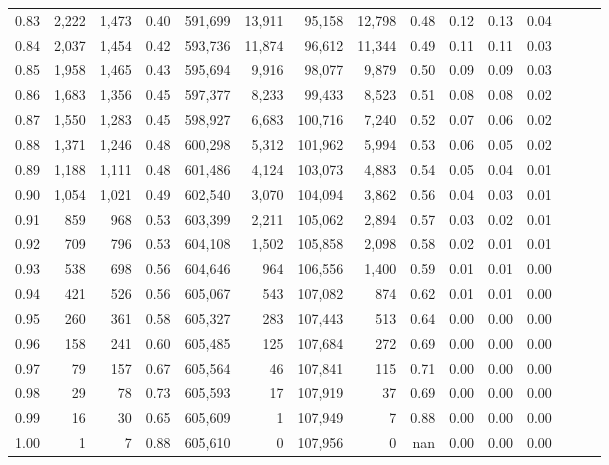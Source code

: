 \begin{tabular}{rrrrrrrrrrrrrrr}
0.83 &   2,222 &  1,473 &  0.40 &  591,699 &   13,911 &   95,158 &   12,798 &  0.48 &  0.12 &  0.13 &      0.04 \\
0.84 &   2,037 &  1,454 &  0.42 &  593,736 &   11,874 &   96,612 &   11,344 &  0.49 &  0.11 &  0.11 &      0.03 \\
0.85 &   1,958 &  1,465 &  0.43 &  595,694 &    9,916 &   98,077 &    9,879 &  0.50 &  0.09 &  0.09 &      0.03 \\
0.86 &   1,683 &  1,356 &  0.45 &  597,377 &    8,233 &   99,433 &    8,523 &  0.51 &  0.08 &  0.08 &      0.02 \\
0.87 &   1,550 &  1,283 &  0.45 &  598,927 &    6,683 &  100,716 &    7,240 &  0.52 &  0.07 &  0.06 &      0.02 \\
0.88 &   1,371 &  1,246 &  0.48 &  600,298 &    5,312 &  101,962 &    5,994 &  0.53 &  0.06 &  0.05 &      0.02 \\
0.89 &   1,188 &  1,111 &  0.48 &  601,486 &    4,124 &  103,073 &    4,883 &  0.54 &  0.05 &  0.04 &      0.01 \\
0.90 &   1,054 &  1,021 &  0.49 &  602,540 &    3,070 &  104,094 &    3,862 &  0.56 &  0.04 &  0.03 &      0.01 \\
0.91 &     859 &    968 &  0.53 &  603,399 &    2,211 &  105,062 &    2,894 &  0.57 &  0.03 &  0.02 &      0.01 \\
0.92 &     709 &    796 &  0.53 &  604,108 &    1,502 &  105,858 &    2,098 &  0.58 &  0.02 &  0.01 &      0.01 \\
0.93 &     538 &    698 &  0.56 &  604,646 &      964 &  106,556 &    1,400 &  0.59 &  0.01 &  0.01 &      0.00 \\
0.94 &     421 &    526 &  0.56 &  605,067 &      543 &  107,082 &      874 &  0.62 &  0.01 &  0.01 &      0.00 \\
0.95 &     260 &    361 &  0.58 &  605,327 &      283 &  107,443 &      513 &  0.64 &  0.00 &  0.00 &      0.00 \\
0.96 &     158 &    241 &  0.60 &  605,485 &      125 &  107,684 &      272 &  0.69 &  0.00 &  0.00 &      0.00 \\
0.97 &      79 &    157 &  0.67 &  605,564 &       46 &  107,841 &      115 &  0.71 &  0.00 &  0.00 &      0.00 \\
0.98 &      29 &     78 &  0.73 &  605,593 &       17 &  107,919 &       37 &  0.69 &  0.00 &  0.00 &      0.00 \\
0.99 &      16 &     30 &  0.65 &  605,609 &        1 &  107,949 &        7 &  0.88 &  0.00 &  0.00 &      0.00 \\
1.00 &       1 &      7 &  0.88 &  605,610 &        0 &  107,956 &        0 &   nan &  0.00 &  0.00 &      0.00 \\
\bottomrule
\end{tabular}
